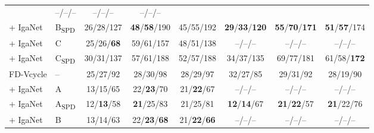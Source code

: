 \documentclass{article}
\theoremstyle{plain}
\numberwithin{equation}{section}
\begin{document}
\begin{table}[!ht]
\begin{tabular}{llcccccc}
                                             & --/--/--                            & --/--/--                    & --/--/--                             \\
        + IgaNet       & B\textsubscript{SPD}& 26/28/127                           & \textbf{48}/\textbf{58}/190 & 45/55/192                            
                                             & \textbf{29}/\textbf{33}/\textbf{120}& \textbf{55}/\textbf{70}/\textbf{171}& \textbf{51}/\textbf{57}/174                             \\
        + IgaNet       & C                   & 25/26/\textbf{68}                   & 59/61/157                   & 48/51/138                            
                                             & --/--/--                            & --/--/--                    & --/--/--                             \\
        + IgaNet       & C\textsubscript{SPD}& 30/31/137                           & 57/61/188                   & 52/57/188                            
                                             & 34/37/135                           & 69/77/181                   & 61/58/\textbf{172}                             \\
        \midrule
        FD-Vcycle      & --                  & 25/27/92                            & 28/30/98                    & 28/29/97                            
                                             & 32/27/85                            & 29/31/92                    & 28/19/90                             \\
        + IgaNet       & A                   & 13/15/65                            & 22/\textbf{23}/70           & 21/\textbf{22}/67                             
                                             & --/--/--                            & --/--/--                    & --/--/--                             \\
        + IgaNet       & A\textsubscript{SPD}& 12/\textbf{13}/58                   & \textbf{21}/25/83           & 21/25/81                    
                                             & \textbf{12}/\textbf{14}/67          & \textbf{21}/\textbf{22}/57  & \textbf{21}/22/76                             \\
        + IgaNet       & B                   & 13/14/63                            & 22/\textbf{23}/\textbf{68}  & 21/\textbf{22}/\textbf{66}                             
                                             & --/--/--                            & --/--/--                    & --/--/--                             \\

\end{tabular}
\end{table}
\end{document}
